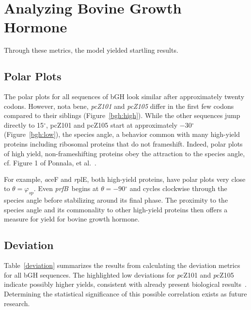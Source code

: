 \documentclass[10pt,twocolumn,draft]{article}
\newcommand{\degree}{\ensuremath{^\circ}}
\newcommand{\prfB}{\emph{prfB}}
\begin{document}
\section{Analyzing Bovine Growth Hormone}

Through these metrics, the model yielded startling results.

\subsection{Polar Plots}

The polar plots for all sequences of bGH look similar after approximately twenty codons.  
However, nota bene, \emph{pcZ101} and \emph{pcZ105} differ in the first few codons compared to
their siblings (Figure~\ref{bgh:high}).
While the other sequences jump directly to 15$\degree$, pcZ101 and pcZ105 start at approximately $-30\degree$
(Figure~\ref{bgh:low}),
the species angle, a behavior common with many high-yield proteins including ribosomal proteins that do not
frameshift. Indeed, polar plots of high yield, non-frameshifting proteins obey the attraction to the species
angle, cf. Figure 1 of Ponnala, et al.~\cite{lalit:mechanics}.

For example, \emph aceF and \emph rplE, both high-yield proteins, have polar plots very close to $\theta = \varphi_{sp}$.
Even \prfB\ begins at $\theta = -90\degree$ and cycles clockwise through the species angle before
stabilizing around its final phase. The proximity to the species angle and its commonality to
other high-yield proteins then offers a measure for yield for bovine growth hormone.


\subsection{Deviation}

Table~\ref{deviation} summarizes the results from calculating the deviation metrics 
for all bGH sequences. The highlighted low deviations for \emph pcZ101 and \emph pcZ105
indicate possibly higher yields, consistent with already present biological results~\cite{schoner:bgh}.
Determining the statistical significance of this possible correlation exists as future research.
\end{document}
